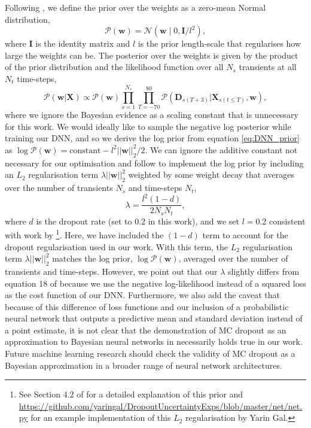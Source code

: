 \documentclass[fleqn,usenatbib]{mnras}
\begin{document}
Following \citet{Gal2015}, we define the prior over the weights as a zero-mean Normal distribution,
\begin{equation}
    \mathcal{P}(\bm{w}) = \mathcal{N}(\bm{w} \mid 0, \bm{I}/l^2),
\label{eq:DNN_prior}
\end{equation}
where $\bm{I}$ is the identity matrix and $l$ is the prior length-scale that regularises how large the weights can be. The posterior over the weights is given by the product of the prior distribution and the likelihood function over all $N_s$ transients at all $N_t$ time-steps,
\begin{equation}
     \mathcal{P}(\bm{w} |\bm{X}) \propto \mathcal{P}(\bm{w}) \prod\limits_{s=1}^{N_s}\prod\limits_{T=-70}^{80} \mathcal{P}(\bm{D}_{s(T+3)}|\bm{X}_{s(t \le T)}, \bm{w}),
\label{eq:DNN_posterior}
\end{equation}
where we ignore the Bayesian evidence as a scaling constant that is unnecessary for this work. We would ideally like to sample the negative log posterior while training our DNN, and so we derive the log prior from equation \ref{eq:DNN_prior} as $\log{\mathcal{P}(\bm{w})} = \mathrm{constant} - l^2 ||\bm{w}||_2^2 / 2$. We can ignore the additive constant not necessary for our optimisation and follow \citet{Gal2015} to implement the log prior by including an $L_2$ regularisation term $\lambda ||\bm{w}||_2^2$ weighted by some weight decay that averages over the number of transients $N_s$ and time-steps $N_t$,
\begin{equation}
    \lambda = \frac{l^2 (1-d)}{2 N_s N_t},
\end{equation}
where $d$ is the dropout rate (set to $0.2$ in this work), and we set $l=0.2$ consistent with work by \citet{Gal2015}\footnote{See Section 4.2 of \citet{Gal2015Appendix} for a detailed explanation of this prior and \url{https://github.com/yaringal/DropoutUncertaintyExps/blob/master/net/net.py} for an example implementation of this $L_2$ regularisation by Yarin Gal.}. Here, we have included the $(1-d)$ term to account for the dropout regularisation used in our work. With this term, the $L_2$ regularisation term $\lambda ||\bm{w}||_2^2$ matches the log prior, $\log{\mathcal{P}(\bm{w})}$, averaged over the number of transients and time-steps. However, we point out that our $\lambda$ slightly differs from equation 18 of \citet{Gal2015Appendix} because we use the negative log-likelihood instead of a squared loss as the cost function of our DNN. Furthermore, we also add the caveat that because of this difference of loss functions and our inclusion of a probabilistic neural network that outputs a predictive mean and standard deviation instead of a point estimate, it is not clear that the demonstration of MC dropout as an approximation to Bayesian neural networks in \citet{Gal2015} necessarily holds true in our work. Future machine learning research should check the validity of MC dropout as a Bayesian approximation in a broader range of neural network architectures.
\end{document}

